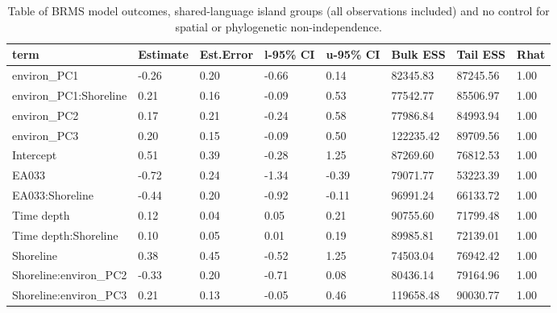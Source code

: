 \begin{table}[ht]
\centering
\begin{tabular}{p{3cm}p{1.35cm}p{1.35cm}p{1.35cm}p{1.35cm}p{1.35cm}p{1.35cm}p{1.35cm}}
  \toprule
term & Estimate & Est.Error & l-95\% CI & u-95\% CI & Bulk ESS & Tail ESS & Rhat \\ 
  \midrule
environ\_PC1 & -0.26 & 0.20 & -0.66 & 0.14 & 82345.83 & 87245.56 & 1.00 \\ 
  environ\_PC1:Shoreline & 0.21 & 0.16 & -0.09 & 0.53 & 77542.77 & 85506.97 & 1.00 \\ 
  environ\_PC2 & 0.17 & 0.21 & -0.24 & 0.58 & 77986.84 & 84993.94 & 1.00 \\ 
  environ\_PC3 & 0.20 & 0.15 & -0.09 & 0.50 & 122235.42 & 89709.56 & 1.00 \\ 
  Intercept & 0.51 & 0.39 & -0.28 & 1.25 & 87269.60 & 76812.53 & 1.00 \\ 
  EA033 & -0.72 & 0.24 & -1.34 & -0.39 & 79071.77 & 53223.39 & 1.00 \\ 
  EA033:Shoreline & -0.44 & 0.20 & -0.92 & -0.11 & 96991.24 & 66133.72 & 1.00 \\ 
  Time depth & 0.12 & 0.04 & 0.05 & 0.21 & 90755.60 & 71799.48 & 1.00 \\ 
  Time depth:Shoreline & 0.10 & 0.05 & 0.01 & 0.19 & 89985.81 & 72139.01 & 1.00 \\ 
  Shoreline & 0.38 & 0.45 & -0.52 & 1.25 & 74503.04 & 76942.42 & 1.00 \\ 
  Shoreline:environ\_PC2 & -0.33 & 0.20 & -0.71 & 0.08 & 80436.14 & 79164.96 & 1.00 \\ 
  Shoreline:environ\_PC3 & 0.21 & 0.13 & -0.05 & 0.46 & 119658.48 & 90030.77 & 1.00 \\ 
   \bottomrule
\end{tabular}
\caption{Table of BRMS model outcomes, shared-language island groups (all observations included) and no control for spatial or phylogenetic non-independence.} 
\label{BRMS_effects_medium_control_none}
\end{table}

